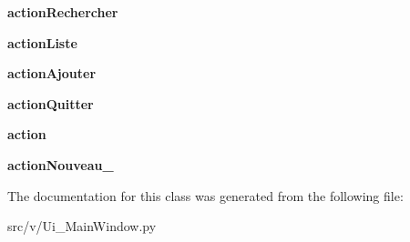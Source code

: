 \begin{DoxyCompactItemize}
\item 
\hypertarget{classv_1_1_ui___main_window_1_1_ui___main_window_a4e25875979b740fab731999732100e36}{}{\bfseries action\+Rechercher}\label{classv_1_1_ui___main_window_1_1_ui___main_window_a4e25875979b740fab731999732100e36}

\item 
\hypertarget{classv_1_1_ui___main_window_1_1_ui___main_window_a8b1187502084cc26a2ef760494769ea4}{}{\bfseries action\+Liste}\label{classv_1_1_ui___main_window_1_1_ui___main_window_a8b1187502084cc26a2ef760494769ea4}

\item 
\hypertarget{classv_1_1_ui___main_window_1_1_ui___main_window_af0e07228ea64e1118ea2bd705fd00686}{}{\bfseries action\+Ajouter}\label{classv_1_1_ui___main_window_1_1_ui___main_window_af0e07228ea64e1118ea2bd705fd00686}

\item 
\hypertarget{classv_1_1_ui___main_window_1_1_ui___main_window_a4e9affd5b02acc6174f957d9338fe8d3}{}{\bfseries action\+Quitter}\label{classv_1_1_ui___main_window_1_1_ui___main_window_a4e9affd5b02acc6174f957d9338fe8d3}

\item 
\hypertarget{classv_1_1_ui___main_window_1_1_ui___main_window_adc51ff181c0cf51349fe51a7e6e6b63e}{}{\bfseries action}\label{classv_1_1_ui___main_window_1_1_ui___main_window_adc51ff181c0cf51349fe51a7e6e6b63e}

\item 
\hypertarget{classv_1_1_ui___main_window_1_1_ui___main_window_aecb81a2876c4b8ed16b92b8134bbb7da}{}{\bfseries action\+Nouveau\+\_}\label{classv_1_1_ui___main_window_1_1_ui___main_window_aecb81a2876c4b8ed16b92b8134bbb7da}

\end{DoxyCompactItemize}


The documentation for this class was generated from the following file\+:\begin{DoxyCompactItemize}
\item 
src/v/Ui\+\_\+\+Main\+Window.\+py\end{DoxyCompactItemize}
